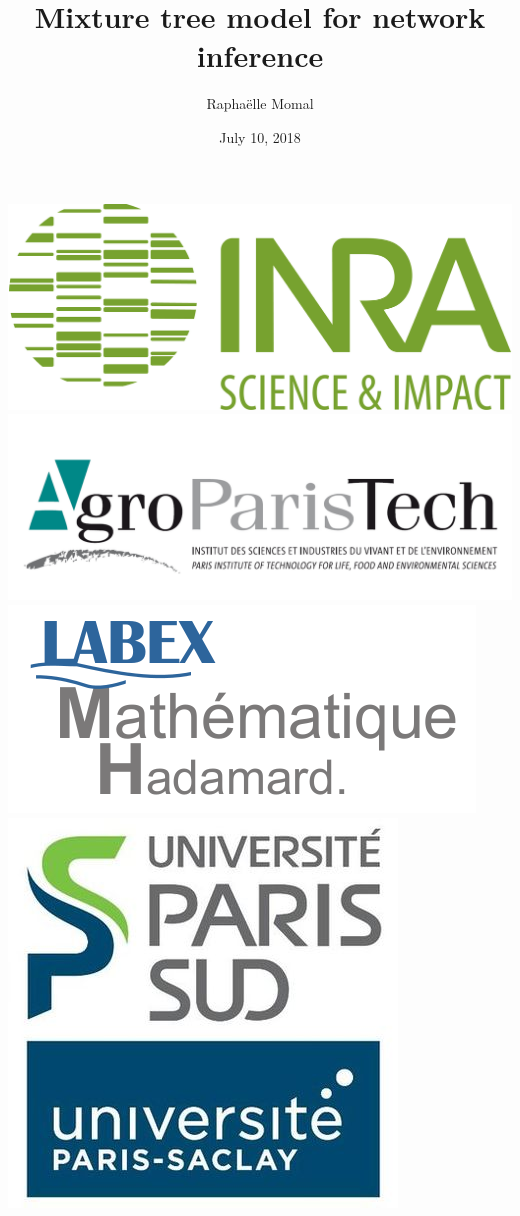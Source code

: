\documentclass[9pt]{beamer}
\title{Mixture tree model for network inference}
\institute[]
{  \inst{1}%
  UMR AgroParisTech / INRA MIA-Paris \\
  \inst{2}%
  LaMME, Evry
  }
\date{July 10, 2018}
\author{Raphaëlle Momal}
\begin{document}
\begin{frame}
    \titlepage
\begin{center}
\vspace{-1cm}
	\includegraphics[width=0.25\linewidth]{logo_inra.jpg}\hspace{0.1cm}
	\includegraphics[width=0.25\linewidth]{agro.PNG}
	\includegraphics[width=0.25\linewidth]{lmh.png}\hspace{0.1cm}
	\includegraphics[width=0.15\linewidth]{upsud.jpg}
    
\end{center}
\end{frame}
\end{document}
